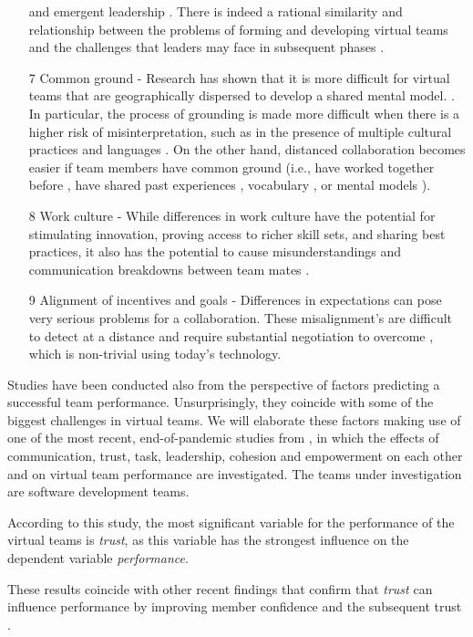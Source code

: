 \begin{itemize}
and emergent leadership \cite{Charlier2016}.  There is indeed a rational similarity and relationship between the problems of forming and developing virtual teams and the challenges that leaders may face in subsequent phases \cite{Abbasnejad2012}.
\item [7] Common ground - Research has shown that it is more difficult for virtual teams that are geographically dispersed to develop a shared mental model. \cite{Maynard2014}.  In particular, the process of grounding is made more difficult when there is a higher risk of misinterpretation, such as in the presence of multiple cultural practices and languages \cite{Olson2000}. On the other hand, distanced collaboration becomes easier if team members have common ground (i.e., have worked together before \cite{Cundill2019}, have shared past experiences \cite{Cundill2019}, vocabulary \cite{Olson2000}, or mental models \cite{Maynard2014}).
\item [8] Work culture - While differences in work culture have the potential for stimulating innovation, proving access to richer skill sets, and sharing best practices, it also has the potential to cause misunderstandings and communication breakdowns between team mates \cite{Bjorn2009}.
\item [9] Alignment of incentives and goals - Differences in expectations can pose very serious problems for a collaboration. These misalignment's are difficult to detect at a distance and require substantial negotiation to overcome \cite{Olson2000}, which is non-trivial using today's technology.
\end{itemize}

Studies have been conducted also from the perspective of factors predicting a successful team performance.  Unsurprisingly,  they coincide with some of the biggest challenges in virtual teams.  We will elaborate these factors making use of one of the most recent,  end-of-pandemic studies from \cite{Garro2021}, in which the effects of communication, trust, task, leadership, cohesion and empowerment on each other and on virtual team performance are investigated. The teams under investigation are software development teams.

According to this study,  the most significant variable for the performance of the virtual teams is \textit{trust},  as this variable has the strongest influence on the dependent variable \textit{performance}. 

These results coincide with other recent findings that confirm that \textit{trust} can influence performance by improving member confidence and the subsequent trust \cite{Crisp2013}. 

